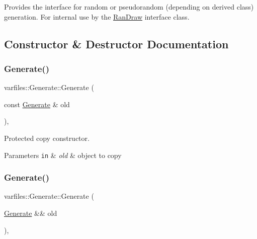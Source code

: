 Provides the interface for random or pseudorandom (depending on derived class) generation. For internal use by the {\ttfamily \hyperlink{classvarfiles_1_1_ran_draw}{Ran\+Draw}} interface class. 

\subsection{Constructor \& Destructor Documentation}
\mbox{\label{classvarfiles_1_1_generate_a43cb2d24eceed4049a01ebfcbe5b66fb}} 
\subsubsection{\texorpdfstring{Generate()}{Generate()}\hspace{0.1cm}{\footnotesize\ttfamily [1/2]}}
{\footnotesize\ttfamily varfiles\+::\+Generate\+::\+Generate (\begin{DoxyParamCaption}\item[{const \hyperlink{classvarfiles_1_1_generate}{Generate} \&}]{old }\end{DoxyParamCaption})\hspace{0.3cm}{\ttfamily [inline]}, {\ttfamily [protected]}}



Protected copy constructor. 


\begin{DoxyParams}[1]{Parameters}
\mbox{\tt in}  & {\em old} & object to copy \\
\hline
\end{DoxyParams}
\mbox{\label{classvarfiles_1_1_generate_ac6d367676afc2e1ab4c10dddc792edc0}} 
\subsubsection{\texorpdfstring{Generate()}{Generate()}\hspace{0.1cm}{\footnotesize\ttfamily [2/2]}}
{\footnotesize\ttfamily varfiles\+::\+Generate\+::\+Generate (\begin{DoxyParamCaption}\item[{\hyperlink{classvarfiles_1_1_generate}{Generate} \&\&}]{old }\end{DoxyParamCaption})\hspace{0.3cm}{\ttfamily [inline]}, {\ttfamily [protected]}}



